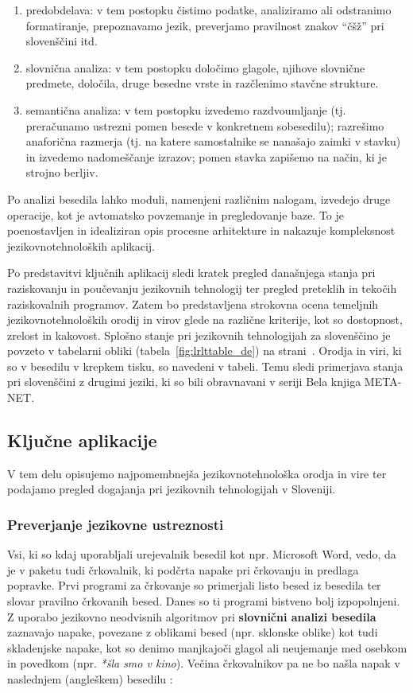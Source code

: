 \begin{multicols}{2}
\begin{enumerate}
\item predobdelava: v tem postopku čistimo podatke, analiziramo ali odstranimo formatiranje, prepoznavamo jezik, preverjamo pravilnost znakov “čšž” pri slovenščini itd.
\item slovnična analiza: v tem postopku določimo glagole, njihove slovnične predmete, določila, druge besedne vrste in razčlenimo stavčne strukture.
\item semantična analiza: v tem postopku izvedemo razdvoumljanje (tj. preračunamo ustrezni pomen besede v konkretnem sobesedilu); razrešimo anaforična razmerja (tj. na katere samostalnike se nanašajo zaimki v stavku) in izvedemo nadomeščanje izrazov; pomen stavka zapišemo na način, ki je strojno berljiv.
\end{enumerate}

Po analizi besedila lahko moduli, namenjeni različnim nalogam, izvedejo druge operacije, kot je avtomatsko povzemanje in pregledovanje baze. To je poenostavljen in idealiziran opis procesne arhitekture in nakazuje kompleksnost jezikovnotehnoloških aplikacij.

Po predstavitvi ključnih aplikacij sledi kratek pregled današnjega stanja pri raziskovanju in poučevanju jezikovnih tehnologij ter pregled preteklih in tekočih raziskovalnih programov. Zatem bo predstavljena strokovna ocena temeljnih jezikovnotehnoloških orodij in virov glede na različne kriterije, kot so dostopnost, zrelost in kakovost. Splošno stanje pri jezikovnih tehnologijah za slovenščino je povzeto v tabelarni obliki (tabela~\ref{fig:lrlttable_de}) na strani~\pageref{fig:lrlttable_de}. Orodja in viri, ki so v besedilu v krepkem tisku, so navedeni v tabeli. Temu sledi primerjava stanja pri slovenščini z drugimi jeziki, ki so bili obravnavani v seriji Bela knjiga META-NET.

\subsection{Ključne aplikacije} 

V tem delu opisujemo najpomembnejša jezikovno\-tehnološka orodja in vire ter podajamo pregled dogajanja pri jezikovnih tehnologijah v Sloveniji.

\subsubsection{Preverjanje jezikovne ustreznosti}

Vsi, ki so kdaj uporabljali urejevalnik besedil kot npr. Microsoft Word, vedo, da je v paketu tudi črkovalnik, ki podčrta napake pri črkovanju in predlaga popravke. Prvi programi za črkovanje so primerjali listo besed iz besedila ter slovar pravilno črkovanih besed. Danes so ti programi bistveno bolj izpopolnjeni. Z uporabo jezikovno neodvisnih algoritmov pri \textbf{slovnični analizi besedila} zaznavajo napake, povezane z oblikami besed (npr. sklonske oblike) kot tudi skladenjske napake, kot so denimo manjkajoči glagol ali  neujemanje med osebkom in povedkom (npr. \textit{*šla smo v kino}). Večina črkovalnikov pa ne bo našla napak v naslednjem (angleškem) besedilu \cite{zar1}:


\end{multicols}
